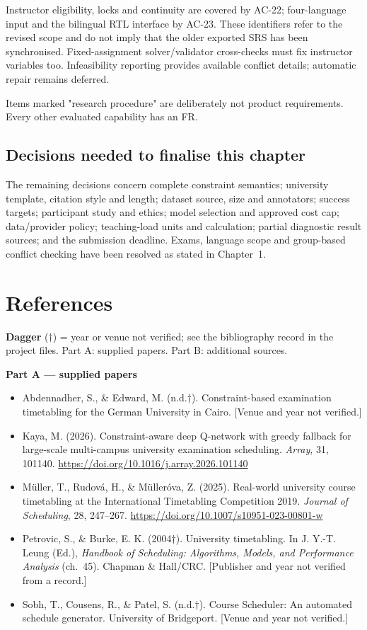 \documentclass[
  11pt,a4paper,oneside]{report}
\begin{document}
Instructor eligibility, locks and continuity are covered by AC-22; four-language input and the bilingual RTL interface by AC-23. These identifiers refer to the revised scope and do not imply that the older exported SRS has been synchronised. Fixed-assignment solver/validator cross-checks must fix instructor variables too. Infeasibility reporting provides available conflict details; automatic repair remains deferred.

Items marked "research procedure" are deliberately not product
requirements. Every other evaluated capability has an FR.

\hypertarget{decisions-needed-to-finalise-this-chapter}{%
\section{Decisions needed to finalise this
chapter}\label{decisions-needed-to-finalise-this-chapter}}

The remaining decisions concern complete constraint semantics; university template, citation style and length; dataset source, size and annotators; success targets; participant study and ethics; model selection and approved cost cap; data/provider policy; teaching-load units and calculation; partial diagnostic result sources; and the submission deadline. Exams, language scope and group-based conflict checking have been resolved as stated in Chapter~1.

\chapter*{References}
\small
\textbf{Dagger} ($\dagger$) = year or venue not verified; see the bibliography record in the project files. Part A: supplied papers. Part B: additional sources.

\medskip\noindent\textbf{Part A --- supplied papers}
\begin{itemize}\setlength{\itemsep}{3pt}
\item Abdennadher, S., \& Edward, M. (n.d.$\dagger$). Constraint-based examination timetabling for the German University in Cairo. [Venue and year not verified.]
\item Kaya, M. (2026). Constraint-aware deep Q-network with greedy fallback for large-scale multi-campus university examination scheduling. \emph{Array}, 31, 101140. \url{https://doi.org/10.1016/j.array.2026.101140}
\item M\"uller, T., Rudov\'a, H., \& M\"uller\'ova, Z. (2025). Real-world university course timetabling at the International Timetabling Competition 2019. \emph{Journal of Scheduling}, 28, 247--267. \url{https://doi.org/10.1007/s10951-023-00801-w}
\item Petrovic, S., \& Burke, E. K. (2004$\dagger$). University timetabling. In J. Y.-T. Leung (Ed.), \emph{Handbook of Scheduling: Algorithms, Models, and Performance Analysis} (ch.~45). Chapman \& Hall/CRC. [Publisher and year not verified from a record.]
\item Sobh, T., Cousens, R., \& Patel, S. (n.d.$\dagger$). Course Scheduler: An automated schedule generator. University of Bridgeport. [Venue and year not verified.]
\end{itemize}
\end{document}
